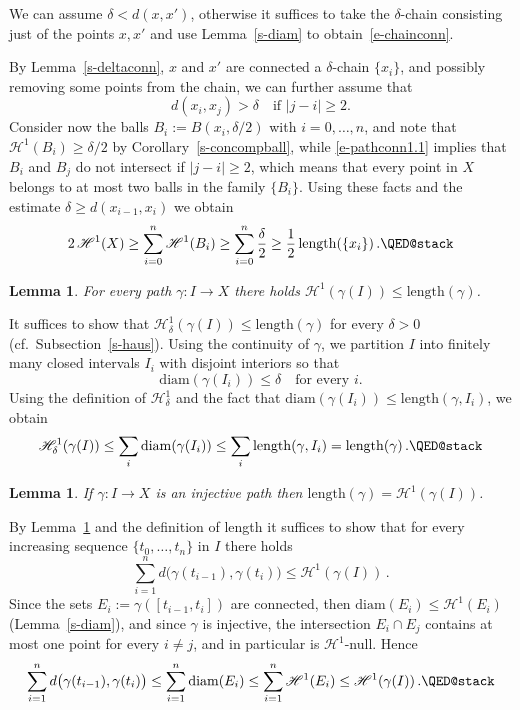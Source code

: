 \documentclass[11pt,reqno,a4paper,final]{amsart}
\makeatletter
\numberwithin{equation}{section}
\theoremstyle{mytheorem}
\newtheorem{lemma}[subsection]{Lemma}
\theoremstyle{myremark}
\theoremstyle{myparagraph}
\renewenvironment{proof}[1][\proofname]{\par 
  \pushQED{\qed}%
  \normalfont \topsep10\p@\@plus6\p@\relax 
  \trivlist 
  \item[\hskip\labelsep 
    \bfseries 
    #1\@addpunct{.}]\ignorespaces 
}{%
  \popQED\endtrivlist\@endpefalse 
}
\providecommand{\proofname}{Proof}
\newcommand{\Haus}{\mathscr{H}}
\newcommand{\Len}{\mathrm{length}}
\newcommand{\diam}{\mathrm{diam}}
\makeatother
\begin{document}
\begin{proof}
We can assume $\delta<d(x,x')$, otherwise
it suffices to take the $\delta$-chain consisting
just of the points $x,x'$ and use Lemma~\ref{s-diam}
to obtain~\eqref{e-chainconn}.

By Lemma~\ref{s-deltaconn},
$x$ and $x'$ are connected a $\delta$-chain
$\{x_i\}$, and 
possibly removing some points from the chain, 
we can further assume that
%
\begin{equation}
\label{e-pathconn1.1}
d(x_i,x_j)>\delta
\quad\text{if $|j-i|\ge 2$.}
\end{equation}
%
Consider now the balls $B_i:=B(x_i,\delta/2)$ with $i=0,\dots,n$, 
and note that
$\Haus^1(B_i)\ge\delta/2$ by Corollary~\ref{s-concompball}, 
while \eqref{e-pathconn1.1} implies that $B_i$ and $B_j$
do not intersect if $|j-i|\ge 2$, which means that
every point in $X$ belongs to at most two balls 
in the family $\{B_i\}$. 
Using these facts and the estimate $\delta \ge d(x_{i-1},x_i)$
we obtain
\[
2\, \Haus^1(X) 
\ge \sum_{i=0}^n \Haus^1(B_i)
\ge \sum_{i=0}^n \frac{\delta}{2}
\ge \frac{1}{2} \, \Len(\{x_i\})
\, .
\qedhere
\]
\end{proof}



\begin{lemma}
\label{s-lengthformula2}
For every path $\gamma:I\to X$ there holds
$\Haus^1(\gamma(I)) \le \Len(\gamma)$.
\end{lemma}

\begin{proof}
It suffices to show that $\Haus^1_\delta(\gamma(I)) \le \Len(\gamma)$
for every $\delta>0$ (cf.~Subsection~\ref{s-haus}).
Using the continuity of $\gamma$, we partition $I$ into finitely many
closed intervals $I_i$ with disjoint interiors so that
\[
\diam(\gamma(I_i)) \le \delta
\quad\text{for every $i$.}
\]
Using the definition of $\Haus^1_\delta$ and the fact that
$\diam(\gamma(I_i)) \le \Len(\gamma, I_i)$, we obtain
\[
\Haus^1_\delta(\gamma(I)) 
\le \sum_i \diam(\gamma(I_i)) 
\le \sum_i \Len(\gamma, I_i)
=\Len(\gamma)
\, .
\qedhere
\]
\end{proof}


\begin{lemma}
\label{s-lengthformula3}
If $\gamma:I\to X$ is an injective path then
$\Len(\gamma) = \Haus^1(\gamma(I))$.
\end{lemma}

\begin{proof}
By Lemma~\ref{s-lengthformula2} and the definition of
length it suffices to show that for every increasing sequence
$\{t_0,\dots,t_n\}$ in $I$ there holds
\[
\sum_{i=1}^n d \big(\gamma(t_{i-1}),\gamma(t_i) \big)
\le \Haus^1(\gamma(I))
\, .
\]
Since the sets $E_i:=\gamma([t_{i-1},t_i])$ are
connected, then
$\diam(E_i) \le \Haus^1(E_i)$ (Lemma~\ref{s-diam}),
and since $\gamma$ is injective, 
the intersection $E_i\cap E_j$ contains at most one point
for every $i\ne j$, and in particular is $\Haus^1$-null. 
Hence
\[
\sum_{i=1}^n d \big(\gamma(t_{i-1}),\gamma(t_i) \big)
\le \sum_{i=1}^n \diam(E_i) 
\le \sum_{i=1}^n \Haus^1(E_i) 
\le \Haus^1(\gamma(I))
\, .
\qedhere
\]
\end{proof}
\end{document}
